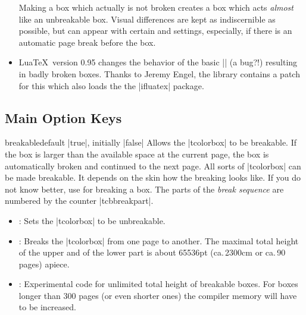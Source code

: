 \begin{itemize}
  Making a box  which actually is not broken creates
  a box which acts \emph{almost} like an unbreakable box. Visual differences
  are kept as indiscernible as possible, but can appear with certain
   and  settings, especially, if there
  is an automatic page break before the box.
\item{}
  Lua\TeX\ version 0.95 changes the behavior of the basic |\vsplit| (a bug?!)
  resulting in badly broken boxes. Thanks to Jeremy Engel,
  the  library contains a patch for this which
  also loads the the |ifluatex| package.
\end{itemize}


\clearpage
\subsection{Main Option Keys}
\begin{docTcbKey}[][doc updated=2017-02-01]{breakable}{}{default |true|, initially |false|}
  Allows the |tcolorbox| to be breakable. If the box is larger than the
  available space at the current page, the box is automatically broken
  and continued to the next page. All sorts of |tcolorbox| can be made
  breakable. It depends on the skin how the breaking looks like.
  If you do not know better, use  for breaking a box.
  The parts of the \emph{break sequence} are numbered
  by the counter |tcbbreakpart|.
  \begin{itemize}
  \item{}: Sets the |tcolorbox| to be unbreakable.
  \item{}: Breaks the |tcolorbox| from one page to another.
    The maximal total height of the upper and of the lower part is
    about 65536pt (ca.\,2300cm or ca.\,90 pages) apiece.
  \item{}: Experimental code for unlimited total height of
    breakable boxes.
    For boxes longer than 300 pages (or even shorter ones) the
    compiler memory will have to be increased.
  \end{itemize}

\begin{dispListing}

\begin{tcolorbox}[breakable,title=My breakable box]
\lipsum[1-6]
\end{tcolorbox}
\end{dispListing}
\end{docTcbKey}
{\tcbusetemp}


